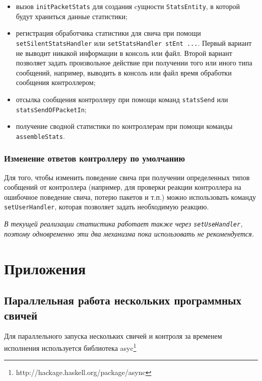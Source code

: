 \documentclass[9pt,a4paper]{article}
\begin{document}
\begin{itemize}
  \item вызов \lstinline!initPacketStats! для создания cущности \lstinline!StatsEntity!,
    в которой будут храниться данные статистики;
  \item регистрация обработчика статистики для свича при помощи 
    \lstinline!setSilentStatsHandler! или \lstinline!setStatsHandler stEnt ...!. Первый вариант не выводит никакой информации в консоль или файл. Второй вариант позволяет задать произвольное действие при получении того или иного типа сообщений, например, выводить в консоль или файл время обработки сообщения контроллером;
  \item отсылка сообщения контроллеру при помощи команд \lstinline!statsSend! или
    \lstinline!statsSendOFPacketIn!;
  \item получение сводной статистики по контроллерам при помощи команды
    \lstinline!assembleStats!.
\end{itemize}

\subsubsection{Изменение ответов контроллеру по умолчанию}

Для того, чтобы изменить поведение свича при получении определенных типов сообщений от контроллера (например, для
проверки реакции контроллера на ошибочное поведение свича, потерю пакетов и т.п.)
можно использовать команду \lstinline!setUserHandler!, которая позволяет задать
необходимую реакцию.

\emph{В текущей реализации статистика работает также через \lstinline!setUseHandler!,
поэтому одновременно эти два механизма пока использовать не рекомендуется.}

\section{Приложения}

\subsection{Параллельная работа нескольких программных свичей}

Для параллельного запуска нескольких свичей и контроля за временем исполнения
используется библиотека asyc\footnote{http://hackage.haskell.org/package/async}
\end{document}
